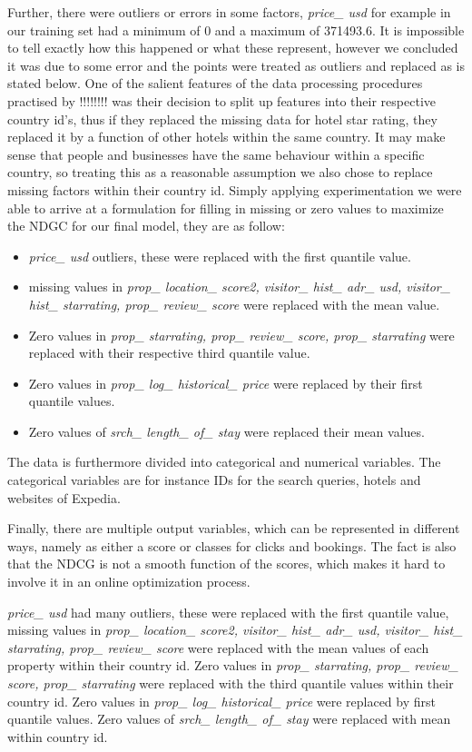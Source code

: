 \documentclass{llncs}
\begin{document}
	Further, there were outliers or errors in some factors, \textit{price\_ usd} for example in our training set had a minimum of 0 and a maximum of 371493.6. It is impossible to tell exactly how this happened or what these represent, however we concluded it was due to some error and the points were treated as outliers and replaced as is stated below. One of the salient features of the data processing procedures practised by !!!!!!!! was their decision to split up features into their respective country id's, thus if they replaced the missing data for hotel star rating, they replaced it by a function of other hotels within the same country. It may make sense that people and businesses have the same behaviour within a specific country, so treating this as a reasonable assumption we also chose to replace missing factors within their country id. Simply applying experimentation we were able to arrive at a formulation for filling in missing or zero values to maximize the NDGC for our final model, they are as follow:
	\begin{itemize}
	\item \textit{price\_ usd} outliers, these were replaced with the first quantile value.
	\item missing values in \textit{prop\_ location\_ score2, visitor\_ hist\_ adr\_ usd, visitor\_ hist\_ starrating, prop\_ review\_ score} were replaced with the mean value. 
	\item Zero values in \textit{prop\_ starrating, prop\_ review\_ score, prop\_ starrating} were replaced with their respective third quantile value.
	\item Zero values in \textit{prop\_ log\_ historical\_ price} were replaced by their first quantile values. 
	\item Zero values of \textit{srch\_ length\_ of\_ stay} were replaced their mean values.
	\end{itemize}

The data is furthermore divided into categorical and numerical variables. The categorical variables are for instance IDs for the search queries, hotels and websites of Expedia.  

Finally, there are multiple output variables, which can be represented in different ways, namely as either a score or classes for clicks and bookings. The fact is also that the NDCG is not a smooth function of the scores, which makes it hard to involve it in an online optimization process.            


\textit{price\_ usd} had many outliers, these were replaced with the first quantile value, missing values in \textit{prop\_ location\_ score2, visitor\_ hist\_ adr\_ usd, visitor\_ hist\_ starrating, prop\_ review\_ score} were replaced with the mean values of each property within their country id. Zero values in \textit{prop\_ starrating, prop\_ review\_ score, prop\_ starrating} were replaced with the third quantile values within their country id. Zero values in \textit{prop\_ log\_ historical\_ price} were replaced by first quantile values. Zero values of \textit{srch\_ length\_ of\_ stay} were replaced with mean within country id.
\end{document}
